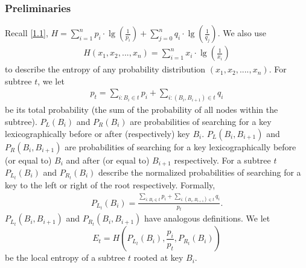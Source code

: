 \documentclass[]{beamer}
\theoremstyle{plain}
\begin{document}
\begin{frame} \frametitle{Preliminaries}

Recall \ref{1.1}, $H = \sum_{i=1}^{n} p_i\cdot\lg(\frac{1}{p_i}) + \sum_{j=0}^{n} q_i\cdot\lg(\frac{1}{q_j})$. We also use
\begin{align*}
H(x_1,x_2,...,x_n) = \sum_{i=1}^{n} x_i\cdot\lg(\frac{1}{x_i})
\end{align*} to describe the entropy of any probability distribution $(x_1, x_2, ...., x_n)$. For subtree $t$, we let 
\begin{align*}
p_t=\sum_{i : B_i \in t} p_i + \sum_{i : (B_i, B_{i+1}) \in t} q_i
\end{align*}
 be its total probability (the sum of the probability of all nodes within the subtree). $P_{L}(B_i)$ and $P_{R}(B_i)$ are probabilities of searching for a key lexicographically before or after (respectively) key $B_i$. $P_{L}(B_i, B_{i+1})$ and $P_{R}(B_i, B_{i+1})$ are probabilities of searching for a key lexicographically before (or equal to) $B_i$ and after (or equal to) $B_{i+1}$ respectively. For a subtree  $t$ $P_{L_t}(B_i)$ and $P_{R_t}(B_i)$ describe the normalized probabilities of searching for a key to the left or right of the root respectively. Formally,
\begin{align*}
P_{L_t}(B_i) = \frac{\sum_{i : B_i \in t} p_i + \sum_{i : (B_i, B_{i+1}) \in t} q_i}{p_t}.
\end{align*}
$P_{L_t}(B_i,B_{i+1})$ and $P_{R_t}(B_i,B_{i+1})$ have analogous definitions. 
We let  
\begin{equation}
E_t=H(P_{L_t}(B_i), \frac{p_i}{p_t}, P_{R_t}(B_i))
\end{equation} be the local entropy of a subtree $t$ rooted at key $B_i$.  
\end{frame}
\end{document}
